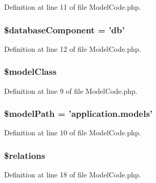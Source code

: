 Definition at line 11 of file ModelCode.php.

\hypertarget{classModelCode_a87a1491288adbff7947ce1bb223dcd3a}{
\subsubsection[{\$databaseComponent}]{\setlength{\rightskip}{0pt plus 5cm}\$databaseComponent = 'db'}}
\label{classModelCode_a87a1491288adbff7947ce1bb223dcd3a}


Definition at line 12 of file ModelCode.php.

\hypertarget{classModelCode_aaba2952ca851db29e7fffe58808aa4aa}{
\subsubsection[{\$modelClass}]{\setlength{\rightskip}{0pt plus 5cm}\$modelClass}}
\label{classModelCode_aaba2952ca851db29e7fffe58808aa4aa}


Definition at line 9 of file ModelCode.php.

\hypertarget{classModelCode_a349ce28f73e8c77a58b4f0eca3f4252b}{
\subsubsection[{\$modelPath}]{\setlength{\rightskip}{0pt plus 5cm}\$modelPath = 'application.models'}}
\label{classModelCode_a349ce28f73e8c77a58b4f0eca3f4252b}


Definition at line 10 of file ModelCode.php.

\hypertarget{classModelCode_a5787b67dccb801e89f4ff779d42edece}{
\subsubsection[{\$relations}]{\setlength{\rightskip}{0pt plus 5cm}\$relations}}
\label{classModelCode_a5787b67dccb801e89f4ff779d42edece}


Definition at line 18 of file ModelCode.php.

